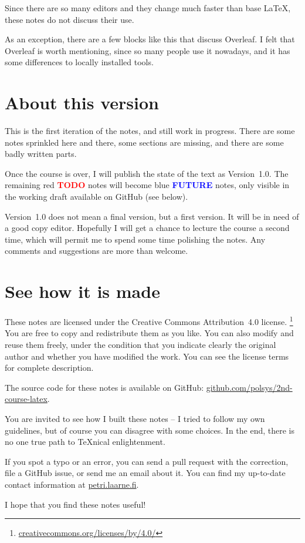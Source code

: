 Since there are so many editors and they change much faster than base \LaTeX,
these notes do not discuss their use.

\begin{overleaf}
As an exception, there are a few blocks like this that discuss Overleaf.
I felt that Overleaf is worth mentioning, since so many people use it nowadays,
and it has some differences to locally installed tools.
\end{overleaf}


%
%
\section{About this version}

This is the first iteration of the notes, and still work in progress.
There are some  notes sprinkled here and there,
some sections are missing,
and there are some badly written parts.

Once the course is over, I will publish the state of the text as Version~1.0.
The remaining red \textcolor{red}{\textbf{TODO}} notes will become
blue \textcolor{blue}{\textbf{FUTURE}} notes,
only visible in the working draft available on GitHub (see below).

Version~1.0 does not mean a final version, but a first version.
It will be in need of a good copy editor.
Hopefully I will get a chance to lecture the course a second time,
which will permit me to spend some time polishing the notes.
Any comments and suggestions are more than welcome.



%
%
\section{See how it is made}

\noindent{\Huge\faCreativeCommons\faCreativeCommonsBy}
These notes are licensed under the Creative Commons Attribution~4.0 license.%
\footnote{\url{creativecommons.org/licenses/by/4.0/}}
You are free to copy and redistribute them as you like.
You can also modify and reuse them freely,
under the condition that you indicate clearly the original author
and whether you have modified the work.
You can see the license terms for complete description.

\bigskip\noindent{\huge\faGithub}
The source code for these notes is available on GitHub:
\url{github.com/polsys/2nd-course-latex}.

You are invited to see how I built these notes
-- I tried to follow my own guidelines, but of course you can disagree with some choices.
In the end, there is no one true path to \TeX nical enlightenment.

If you spot a typo or an error, you can send a pull request with the correction,
file a GitHub issue, or send me an email about it.
You can find my up-to-date contact information at \url{petri.laarne.fi}.

\bigskip\noindent
I hope that you find these notes useful!
